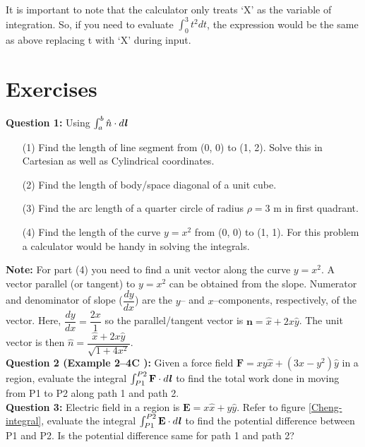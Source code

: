 \documentclass[12pt,a4paper]{article}
\begin{document}
It is important to note that the calculator only treats `X' as the variable of integration. So, if you need to evaluate $\int_{0}^{3}t^2dt$, the expression would be the same as above replacing t with `X' during input.
\section{Exercises}
\noindent\textbf{Question 1:} Using $\int_{a}^{b}\hat n\cdot d\textbf{\textit{l}}$
\begin{itemize}
\item[(1)] Find the length of line segment from (0, 0) to (1, 2). Solve this in Cartesian as well as Cylindrical coordinates.
\item[(2)] Find the length of body/space diagonal of a unit cube.
\item[(3)] Find the arc length of a quarter circle of radius $\rho=3$ m in first quadrant.
\item[(4)] Find the length of the curve $y=x^2$ from (0, 0) to (1, 1). For this problem a calculator would be handy in solving the integrals.
\end{itemize}
\noindent\textbf{Note:} For part (4) you need to find a unit vector along the curve $y=x^2$. A vector parallel (or tangent) to $y=x^2$ can be obtained from the slope. Numerator and denominator of slope ($\dfrac{dy}{dx}$) are the $y$-- and $x$--components, respectively, of the vector. Here, $\dfrac{dy}{dx}=\dfrac{2x}{1}$ so the parallel/tangent vector is $\textbf{n}=\hat x+2x\hat y$. The unit vector is then $\hat n=\dfrac{\hat x+2x\hat y}{\sqrt{1+4x^2}}$.\\
\noindent\textbf{Question 2 (Example 2--4C \cite[Example 2--4, page 23]{Cheng}):} Given a force field $\textbf{F}=xy\hat x+(3x-y^2)\hat y$ in a region, evaluate the integral $\int_{P1}^{P2}\textbf{F}\cdot d\textbf{\textit{l}}$ to find the total work done in moving from P1 to P2 along path 1 and path 2.\\
\noindent\textbf{Question 3:} Electric field in a region is $\textbf{E}=x\hat x+y\hat y$. Refer to figure \ref{Cheng-integral}, evaluate the integral $\int_{P1}^{P2}\textbf{E}\cdot d\textbf{\textit{l}}$ to find the potential difference between P1 and P2. Is the potential difference same for path 1 and path 2?
\end{document}
